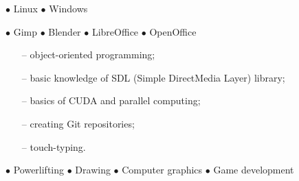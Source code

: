\documentclass[11pt,a4paper]{article}
\begin{document}
    \bigskip
    \noindent
    \begin{minipage}[t]{0.35\textwidth}
  
        
        
        \medskip
        \centerline{
            \hfill
            $\bullet$ Linux
            \hfill
            $\bullet$ Windows
            \hfill
        }
    \end{minipage}
    \begin{minipage}[t]{0.65\textwidth}
  
        
        
        \medskip
        \centerline{
            \hfill
            $\bullet$ Gimp
            \hfill
            $\bullet$ Blender
            \hfill
            $\bullet$ LibreOffice
            \hfill
            $\bullet$ OpenOffice
            \hfill
        }
    \end{minipage}
  
  
    \bigskip
    \vspace{-1mm}
    \begin{itemize} \itemsep2pt \parskip0pt 
        \item[--] object-oriented programming;
        \item[--] basic knowledge of SDL (Simple DirectMedia Layer) library;
        \item[--] basics of CUDA and parallel computing;
        \item[--] creating Git repositories;
        \item[--] touch-typing.
    \end{itemize}
  
  
    \vspace{0.3cm}
  
    \medskip
    \centerline{
        \hfill
        $\bullet$ Powerlifting
        \hfill
        $\bullet$ Drawing
        \hfill
        $\bullet$ Computer graphics
        \hfill
        $\bullet$ Game development
        \hfill
    }
  
\end{document}
